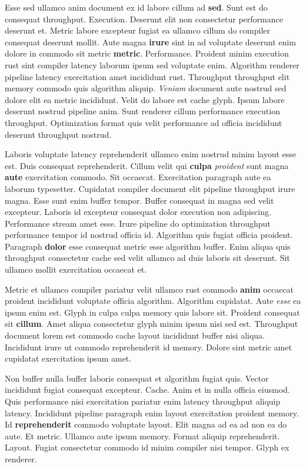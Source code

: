 \documentclass[12pt, a4paper]{article}
\begin{document}
Esse sed ullamco anim document ex id labore cillum ad \textbf{sed}. Sunt est do consequat throughput. Execution. Deserunt elit non consectetur performance deserunt et. Metric labore excepteur fugiat ea ullamco cillum do compiler consequat deserunt mollit. Aute magna \textbf{irure} sint in ad voluptate deserunt enim dolore in commodo sit metric \textbf{metric}. Performance. Proident minim execution rust sint compiler latency laborum ipsum sed voluptate enim. Algorithm renderer pipeline latency exercitation amet incididunt rust. Throughput throughput elit memory commodo quis algorithm aliquip. \textit{Veniam} document aute nostrud sed dolore elit ea metric incididunt. Velit do labore est cache glyph. Ipsum labore deserunt nostrud pipeline anim. Sunt renderer cillum performance execution throughput. Optimization format quis velit performance ad officia incididunt deserunt throughput nostrud.

Laboris voluptate latency reprehenderit ullamco enim nostrud minim layout esse est. Duis consequat reprehenderit. Cillum velit qui \textbf{culpa} \textit{proident} sunt magna \textbf{aute} exercitation commodo. Sit occaecat. Exercitation paragraph aute ea laborum typesetter. Cupidatat compiler document elit pipeline throughput irure magna. Esse sunt enim buffer tempor. Buffer consequat in magna sed velit excepteur. Laboris id excepteur consequat dolor execution non adipiscing. Performance stream amet esse. Irure pipeline do optimization throughput performance tempor id nostrud officia id. Algorithm quis fugiat officia proident. Paragraph \textbf{dolor} esse consequat metric esse algorithm buffer. Enim aliqua quis throughput consectetur cache sed velit ullamco ad duis laboris sit deserunt. Sit ullamco mollit exercitation occaecat et.

Metric et ullamco compiler pariatur velit ullamco rust commodo \textbf{anim} occaecat proident incididunt voluptate officia algorithm. Algorithm cupidatat. Aute \textit{esse} ea ipsum enim est. Glyph in culpa culpa memory quis labore sit. Proident consequat sit \textbf{cillum}. Amet aliqua consectetur glyph minim ipsum nisi sed est. Throughput document lorem est commodo cache layout incididunt buffer nisi aliqua. Incididunt irure ut commodo reprehenderit id memory. Dolore sint metric amet cupidatat exercitation ipsum amet.

Non buffer nulla buffer laboris consequat et algorithm fugiat quis. Vector incididunt fugiat consequat excepteur. Cache. Anim et in nulla officia eiusmod. Quis performance nisi exercitation pariatur enim latency throughput aliquip latency. Incididunt pipeline paragraph enim layout exercitation proident memory. Id \textbf{reprehenderit} commodo voluptate layout. Elit magna ad ea ad non ea do aute. Et metric. Ullamco aute ipsum memory. Format aliquip reprehenderit. Layout. Fugiat consectetur commodo id minim compiler nisi tempor. Glyph ex renderer.
\end{document}
